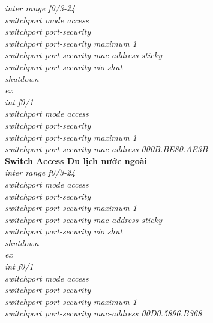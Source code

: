 \documentclass[a4paper, 12pt]{article}
\begin{document}
\hspace*{2cm}\textit{inter range f0/3-24\\
\hspace*{2cm}switchport mode access\\
\hspace*{2cm}switchport port-security\\
\hspace*{2cm}switchport port-security maximum 1\\
\hspace*{2cm}switchport port-security mac-address sticky\\
\hspace*{2cm}switchport port-security vio shut\\
\hspace*{2cm}shutdown\\
\hspace*{2cm}ex\\
\hspace*{2cm}int f0/1\\
\hspace*{2cm}switchport mode access\\
\hspace*{2cm}switchport port-security\\
\hspace*{2cm}switchport port-security maximum 1\\
\hspace*{2cm}switchport port-security mac-address 000B.BE80.AE3B\\}
\hspace*{1cm}\textbf{Switch Access Du lịch nước ngoài}\\
\hspace*{2cm}\textit{inter range f0/3-24\\
\hspace*{2cm}switchport mode access\\
\hspace*{2cm}switchport port-security\\
\hspace*{2cm}switchport port-security maximum 1\\
\hspace*{2cm}switchport port-security mac-address sticky\\
\hspace*{2cm}switchport port-security vio shut\\
\hspace*{2cm}shutdown\\
\hspace*{2cm}ex\\
\hspace*{2cm}int f0/1\\
\hspace*{2cm}switchport mode access\\
\hspace*{2cm}switchport port-security\\
\hspace*{2cm}switchport port-security maximum 1\\
\hspace*{2cm}switchport port-security mac-address 00D0.5896.B368\\}
\end{document}
